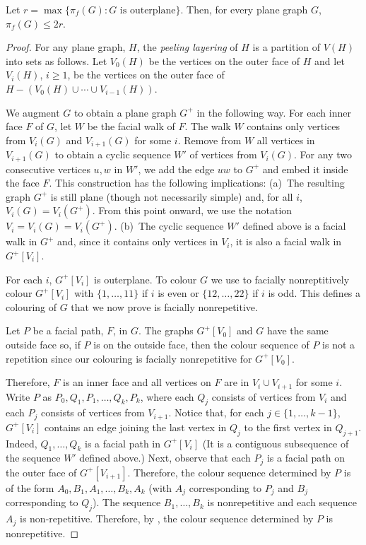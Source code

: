 \documentclass{patmorin}
\begin{document}
\begin{thm}
   Let $r=\max\{\pi_f(G):\text{$G$ is outerplane}\}$.  Then, for every
   plane graph $G$, $\pi_f(G)\le 2r$.
\end{thm}

\begin{proof}
   For any plane graph, $H$, the \emph{peeling layering} of $H$ is
   a partition of $V(H)$ into sets as follows.  Let $V_0(H)$ be the
   vertices on the outer face of $H$ and let $V_i(H)$, $i\ge 1$, be the
   vertices on the outer face of $H-(V_0(H)\cup\cdots\cup V_{i-1}(H))$.

   We augment $G$ to obtain a plane graph $G^+$ in the following way.
   For each inner face $F$ of $G$, let $W$ be the facial walk of $F$.
   The walk $W$ contains only vertices from $V_i(G)$ and $V_{i+1}(G)$
   for some $i$.  Remove from $W$ all vertices in $V_{i+1}(G)$ to
   obtain a cyclic sequence $W'$ of vertices from $V_i(G)$.  For any
   two consecutive vertices $u,w$ in $W'$, we add the edge $uw$
   to $G^+$ and embed it inside the face $F$. This construction has
   the following implications: (a)~The resulting graph $G^+$
   is still plane (though not necessarily simple) and, for all
   $i$, $V_i(G)=V_i(G^+)$. From this point onward, we use the notation
   $V_i=V_i(G)=V_i(G^+)$.
   (b)~The cyclic sequence $W'$ defined above is a facial walk
   in $G^+$ and, since it contains only vertices in $V_i$, it is also
   a facial walk in $G^+[V_i]$.

   For each $i$, $G^+[V_i]$ is outerplane.  To colour $G$ we use
    to facially nonreptitively colour $G^+[V_i]$ with
   $\{1,\ldots,11\}$ if $i$ is even or $\{12,\ldots,22\}$ if $i$ is odd.
   This defines a colouring of $G$ that we now prove is facially
   nonrepetitive.

   Let $P$ be a facial path, $F$, in $G$. The graphs $G^+[V_0]$ and $G$
   have the same outside face so, if $P$ is on the outside face,
   then the colour sequence of $P$ is not a repetition
   since our colouring is facially nonrepetitive for $G^+[V_0]$.

   Therefore, $F$ is an inner face and all vertices on $F$ are in $V_i\cup
   V_{i+1}$ for some $i$.  Write $P$ as $P_0,Q_1,P_1,\ldots,Q_k,P_k$,
   where each $Q_j$ consists of vertices from $V_i$ and each $P_j$
   consists of vertices from $V_{i+1}$.  Notice that, for each
   $j\in\{1,\ldots,k-1\}$, $G^+[V_i]$ contains an edge joining the
   last vertex in $Q_j$ to the first vertex in $Q_{j+1}$.  Indeed,
   $Q_{1},\ldots,Q_k$ is a facial path in $G^+[V_i]$ (It is a contiguous
   subsequence of the sequence $W'$ defined above.)  Next, observe that
   each $P_j$ is a facial path on the outer face of $G^+[V_{i+1}]$.
   Therefore, the colour sequence determined by $P$ is of the form
   $A_0,B_1,A_1,\ldots,B_k,A_k$ (with $A_j$ corresponding to $P_j$
   and $B_j$ corresponding to $Q_j$).  The sequence $B_1,\ldots,B_k$ is
   nonrepetitive and each sequence $A_j$ is non-repetitive.  Therefore,
   by , the colour sequence determined by $P$
   is nonrepetitive.
\end{proof}
\end{document}
